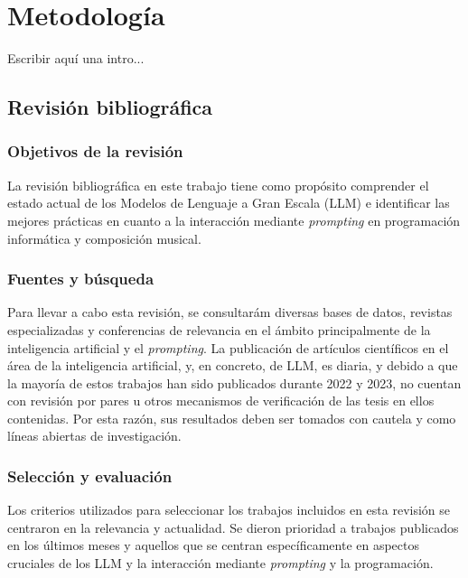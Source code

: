\chapter{Metodología}


Escribir aquí una intro...

\section{Revisión bibliográfica}

\subsection{Objetivos de la revisión}
La revisión bibliográfica en este trabajo tiene como propósito comprender el estado actual de los Modelos de Lenguaje a Gran Escala (LLM) e identificar las mejores prácticas en cuanto a la interacción mediante \textit{prompting} en programación informática y composición musical.

\subsection{Fuentes y búsqueda}
Para llevar a cabo esta revisión, se consultarám diversas bases de datos, revistas especializadas y conferencias de relevancia en el ámbito principalmente de la inteligencia artificial y el \textit{prompting}. La publicación de artículos científicos en el área de la inteligencia artificial, y, en concreto, de LLM, es diaria, y debido a que la mayoría de estos trabajos han sido publicados durante 2022 y 2023, no cuentan con revisión por pares u otros mecanismos de verificación de las tesis en ellos contenidas. Por esta razón, sus resultados deben ser tomados con cautela y como líneas abiertas de investigación.

\subsection{Selección y evaluación}
Los criterios utilizados para seleccionar los trabajos incluidos en esta revisión se centraron en la relevancia y actualidad. Se dieron prioridad a trabajos publicados en los últimos meses y aquellos que se centran específicamente en aspectos cruciales de los LLM y la interacción mediante \textit{prompting} y la programación. 

